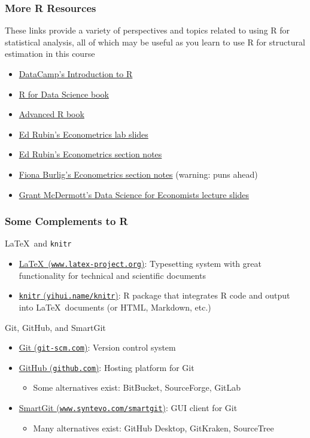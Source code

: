 \documentclass{beamer}
\begin{document}
\begin{frame}\frametitle{More R Resources}
    These links provide a variety of perspectives and topics related to using R for statistical analysis, all of which may be useful as you learn to use R for structural estimation in this course
    \begin{itemize}
        \item \href{https://www.datacamp.com/courses/free-introduction-to-r}{DataCamp's Introduction to R}
        \item \href{https://r4ds.had.co.nz/}{R for Data Science book}
        \item \href{https://adv-r.hadley.nz/}{Advanced R book}
        \item \href{https://github.com/edrubin/EC525S19}{Ed Rubin's Econometrics lab slides}
        \item \href{http://edrub.in/ARE212/notes.html}{Ed Rubin's Econometrics section notes}
        \item \href{https://www.fionaburlig.com/teaching/are212}{Fiona Burlig's Econometrics section notes} (warning: puns ahead)
        \item \href{https://github.com/uo-ec607/lectures}{Grant McDermott's Data Science for Economists lecture slides}
    \end{itemize}
\end{frame}

\begin{frame}\frametitle{Some Complements to R}
    \LaTeX\ and \texttt{knitr}
    \begin{itemize}
        \item \href{https://www.latex-project.org/}{\LaTeX\ (\texttt{www.latex-project.org})}: Typesetting system with great functionality for technical and scientific documents
        \item \href{https://yihui.name/knitr/}{\texttt{knitr} (\texttt{yihui.name/knitr})}: R package that integrates R code and output into \LaTeX\ documents (or HTML, Markdown, etc.)
    \end{itemize}
    \vspace{3ex}
    Git, GitHub, and SmartGit
    \begin{itemize}
        \item \href{https://git-scm.com/}{Git (\texttt{git-scm.com})}: Version control system
        \item \href{https://github.com/}{GitHub (\texttt{github.com})}: Hosting platform for Git
        \begin{itemize}
            \item Some alternatives exist: BitBucket, SourceForge, GitLab
        \end{itemize}
        \item \href{https://www.syntevo.com/smartgit/}{SmartGit (\texttt{www.syntevo.com/smartgit})}: GUI client for Git
        \begin{itemize}
            \item Many alternatives exist: GitHub Desktop, GitKraken, SourceTree
        \end{itemize}
    \end{itemize}
\end{frame}
\end{document}
